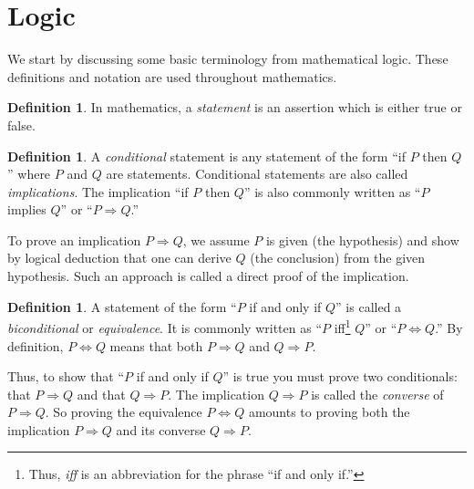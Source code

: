 \documentclass[11pt]{article}
\theoremstyle{definition}
\newtheorem{defn}[thm]{Definition}
\renewcommand{\implies}{\Rightarrow}
\renewcommand{\iff}{\Leftrightarrow}
\begin{document}



\section{Logic}\noindent
We start by discussing some basic terminology from mathematical
logic. These definitions and notation are used throughout mathematics.

\begin{defn}
  In mathematics, a \emph{statement} is an assertion which is either
  true or false.
\end{defn}

\begin{defn}
  A \emph{conditional} statement is any statement of the form ``if $P$
  then $Q$'' where $P$ and $Q$ are statements. Conditional statements
  are also called \emph{implications}. The
  implication ``if $P$ then $Q$'' is also commonly written as ``$P$
  implies $Q$'' or ``$P \implies Q$.''
\end{defn}

To prove an implication $P \implies Q$, we assume $P$ is given (the
hypothesis) and show by logical deduction that one can derive $Q$ (the
conclusion) from the given hypothesis. Such an approach is called a
direct proof of the implication.

\begin{defn}
A statement of the form ``$P$ if and only if $Q$'' is called a {\em
  biconditional} or
\emph{equivalence}. It is
commonly written as ``$P$ iff\footnote{Thus, \emph{iff} is an
  abbreviation for the phrase ``if and only if.''} $Q$'' or ``$P \iff
Q$.'' By definition, $P \iff Q$ means that both $P \implies Q$ and $Q
\implies P$.
\end{defn}

Thus, to show that ``$P$ if and only if $Q$'' is true you must prove
two conditionals: that $P \implies Q$ and that $Q \Rightarrow P$.  The
implication $Q \implies P$ is called the
\emph{converse} of $P \implies Q$. So proving the
equivalence $P \iff Q$ amounts to proving both the implication $P
\implies Q$ and its converse $Q \implies P$.
\end{document}
